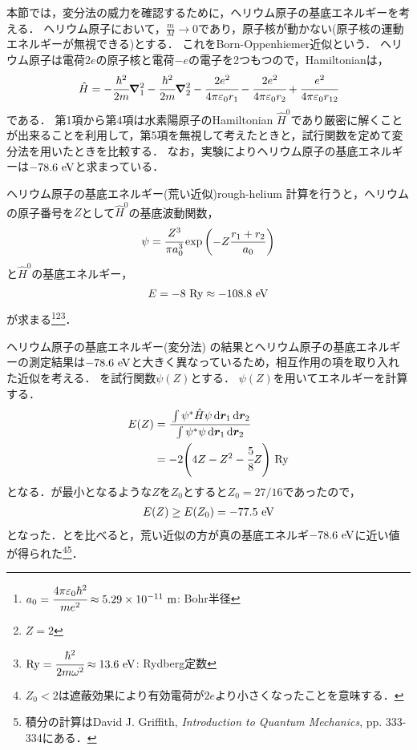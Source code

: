 \documentclass{report}
\begin{document}
  本節では，変分法の威力を確認するために，ヘリウム原子の基底エネルギーを考える．
  ヘリウム原子において，$\frac{m}{M}\to 0$であり，原子核が動かない(原子核の運動エネルギーが無視できる)とする．
  これをBorn-Oppenhiemer近似という．
  ヘリウム原子は電荷$2e$の原子核と電荷$-e$の電子を2つもつので，Hamiltonianは，
    \begin{align}
      \hat{H} = -\cfrac{\hbar^2}{2m}\grad_{1}^{2} -\cfrac{\hbar^2}{2m}\grad_{2}^{2} - \cfrac{2e^2}{4\pi \varepsilon_0 r_1}-\cfrac{2e^2}{4\pi \varepsilon_0 r_2} + \cfrac{e^2}{4\pi \varepsilon_0 r_{12}}
    \end{align}
    である．
    第1項から第4項は水素陽原子のHamiltonian $\hat{H}^0$であり厳密に解くことが出来ることを利用して，第5項を無視して考えたときと，試行関数を定めて変分法を用いたときを比較する．
    なお，実験によりヘリウム原子の基底エネルギーは$-78.6\ \r{eV}$と求まっている．
  \begin{myex}{ヘリウム原子の基底エネルギー(荒い近似)}{rough-helium}
    計算を行うと，ヘリウムの原子番号を$Z$として$\hat{H}^0$の基底波動関数，
    \begin{align}
      \psi = \cfrac{Z^3}{\pi a_0^3}\exp\qty(-Z\frac{r_1 + r_2}{a_0})\label{helium}
    \end{align}
    と$\hat{H}^0$の基底エネルギー，
    \begin{align}
      E = -8\ \mathrm{Ry}\approx -108.8\ \mathrm{eV}\label{helium-rough-min}
    \end{align}
    が求まる\footnote{
      $a_0 = \cfrac{4\pi\epsilon_0\hbar^2}{me^2} \approx 5.29\times 10^{-11}\ \r{m}$: Bohr半径
    }\footnote{
      $Z = 2$
    }\footnote{
      $\mathrm{Ry} = \cfrac{\hbar^2}{2m\omega^2} \approx 13.6 \ \mathrm{eV}$: Rydberg定数
    }．
  \end{myex}
  \begin{myex}{ヘリウム原子の基底エネルギー(変分法)}{}
    の結果とヘリウム原子の基底エネルギーの測定結果は$-78.6\ \r{eV}$と大きく異なっているため，相互作用の項を取り入れた近似を考える．
    を試行関数$\psi(Z)$とする．
    $\psi(Z)$を用いてエネルギーを計算する．
    \begin{align}
      E(Z) &= \cfrac{\int\psi^{*}\hat{H}\psi \dd{\bm{r}_1}\dd{\bm{r}_2}}{\int\psi^{*}\psi \dd{\bm{r}_1}\dd{\bm{r}_2}} \\
      &= -2\qty(4Z - Z^2 - \cfrac{5}{8}Z)\ \r{Ry}\label{helium-energy-function} 
    \end{align}
    となる．が最小となるような$Z$を$Z_0$とすると$Z_0 = 27/16$であったので，
    \begin{align}
      E(Z) \geq E\qty(Z_0) = -77.5\ \r{eV}\label{helium-energy-varidation-min}
    \end{align}
    となった．とを比べると，荒い近似の方が真の基底エネルギ$-78.6\ \r{eV}$に近い値が得られた\footnote{
      $Z_0 < 2$は遮蔽効果により有効電荷が$2e$より小さくなったことを意味する．
    }\footnote{
      積分の計算はDavid J. Griffith, \textit{Introduction to Quantum Mechanics}, pp. 333-334にある．
    }．
  \end{myex}
\end{document}
